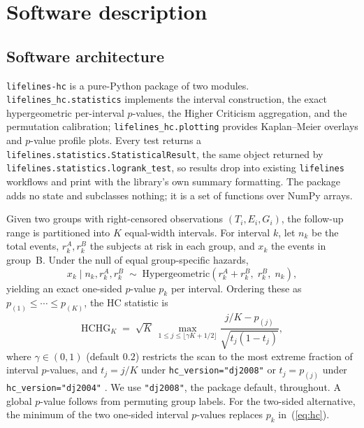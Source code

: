 \documentclass[11pt]{article}
\begin{document}
\section{Software description}

\subsection{Software architecture}

\texttt{lifelines-hc} is a pure-Python package of two modules.
\texttt{lifelines\_hc.statistics} implements the interval construction, the
exact hypergeometric per-interval $p$-values, the Higher Criticism
aggregation, and the permutation calibration;
\texttt{lifelines\_hc.plotting} provides Kaplan--Meier overlays and
$p$-value profile plots. Every test returns a
\texttt{lifelines.statistics.StatisticalResult}, the same object returned by
\texttt{lifelines.statistics.logrank\_test}, so results drop into existing
\texttt{lifelines} workflows and print with the library's own summary
formatting. The package adds no state and subclasses nothing; it is a set of
functions over NumPy arrays.

Given two groups with right-censored observations $(T_i, E_i, G_i)$, the
follow-up range is partitioned into $K$ equal-width intervals. For interval
$k$, let $n_k$ be the total events, $r_k^A, r_k^B$ the subjects at risk in
each group, and $x_k$ the events in group~B. Under the null of equal
group-specific hazards,
%
\begin{equation}\label{eq:hypergeom}
  x_k \;\big|\; n_k, r_k^A, r_k^B
  \;\sim\; \mathrm{Hypergeometric}\!\left(r_k^A + r_k^B,\; r_k^B,\; n_k\right),
\end{equation}
%
yielding an exact one-sided $p$-value $p_k$ per interval. Ordering these as
$p_{(1)} \leq \cdots \leq p_{(K)}$, the HC statistic
\citep{donoho2004,donoho2015special} is
%
\begin{equation}\label{eq:hc}
  \mathrm{HCHG}_K \;=\;
  \sqrt{K}\,
  \max_{1 \leq j \leq \lfloor\gamma K + 1/2\rfloor}
  \frac{j/K - p_{(j)}}{\sqrt{t_j\left(1 - t_j\right)}},
\end{equation}
%
where $\gamma \in (0,1)$ (default $0.2$) restricts the scan to the most
extreme fraction of interval $p$-values, and $t_j = j/K$ under
\texttt{hc\_version="dj2008"} \citep{donoho2008} or $t_j = p_{(j)}$ under
\texttt{hc\_version="dj2004"} \citep{donoho2004}. We use \texttt{"dj2008"},
the package default, throughout.
A global $p$-value follows from permuting group labels. For the two-sided alternative, the minimum of the
two one-sided interval $p$-values replaces $p_k$ in~(\ref{eq:hc}).
\end{document}
